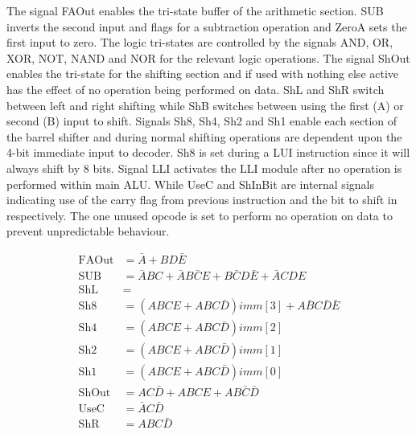 The signal FAOut enables the tri-state buffer of the arithmetic section. 
SUB inverts the second input and flags for a subtraction operation and ZeroA sets the first input to zero. 
The logic tri-states are controlled by the signals AND, OR, XOR, NOT, NAND and NOR for the relevant logic operations. 
The signal ShOut enables the tri-state for the shifting section and if used with nothing else active has the effect of no operation being performed on data. 
ShL and ShR switch between left and right shifting while ShB switches between using the first (A) or second (B) input to shift. 
Signals Sh8, Sh4, Sh2 and Sh1 enable each section of the barrel shifter and during normal shifting operations are dependent upon the 4-bit immediate input to decoder. 
Sh8 is set during a LUI instruction since it will always shift by 8 bits. 
Signal LLI activates the LLI module after no operation is performed within main ALU. 
While UseC and ShInBit are internal signals indicating use of the carry flag from previous instruction and the bit to shift in respectively. 
The one unused opcode is set to perform no operation on data to prevent unpredictable behaviour. 

\begin{align}
	\text{FAOut} &= \bar{A} + BD\bar{E} \label{eq:DecBasicS}\\
	\text{SUB} &= \bar{A}BC + \bar{A}B\bar{C}E + B\bar{C}D\bar{E} + \bar{A}CDE \\
	\text{ShL} &= \\
	\text{Sh8} &= (ABCE + ABC\bar{D})imm[3] + A\bar{B}C\bar{D}\bar{E} \label{eq:DecBasicF} \\
	\text{Sh4} &= (ABCE + ABC\bar{D})imm[2] \\
	\text{Sh2} &= (ABCE + ABC\bar{D})imm[1] \\
	\text{Sh1} &= (ABCE + ABC\bar{D})imm[0] \\
	\text{ShOut} &= AC\bar{D} + ABCE + AB\bar{C}\bar{D} \\
	\text{UseC} &= \bar{A}C\bar{D} \\
	\text{ShR} &= ABC\bar{D}
\end{align}

